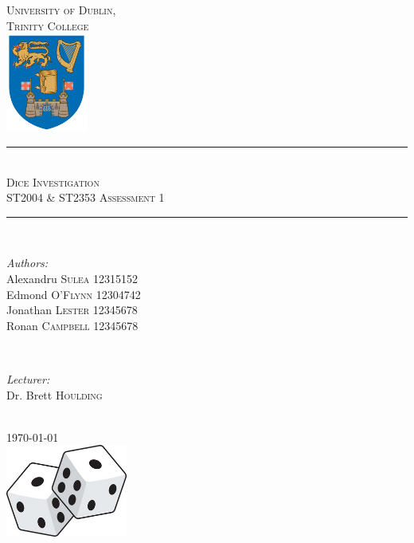 \documentclass[12pt]{article}
\begin{document}
\begin{titlepage}

\newcommand{\HRule}{\rule{\linewidth}{0.5mm}}

\center
\textsc{\LARGE University of Dublin,\\Trinity College}\\[1.0cm]
\includegraphics[width=0.2\textwidth]{logo.png}

\HRule \\[0.4cm]
\textsc{\Large Dice Investigation}\\[0.25cm]
\textsc{\large ST2004 \& ST2353 Assessment 1}\\[0.1cm]
\HRule \\[0.4cm]
 
\begin{minipage}{0.5\textwidth}
\begin{flushleft} \large
\emph{Authors:}
\\Alexandru \textsc{Sulea} 12315152
\\Edmond \textsc{O'Flynn} 12304742
\\Jonathan \textsc{Lester} 12345678
\\Ronan \textsc{Campbell} 12345678
\end{flushleft}
\end{minipage}
~
\begin{minipage}{0.4\textwidth}
\begin{flushleft} 
\large
\emph{Lecturer:} \\
Dr. Brett \textsc{Houlding}
\vspace{1.9cm}
\end{flushleft}
\end{minipage}\\[2cm]

{\large \today}\\[1cm] 

\includegraphics[width=0.3\textwidth]{dice.png}
\clearpage
\end{titlepage}
\end{document}
